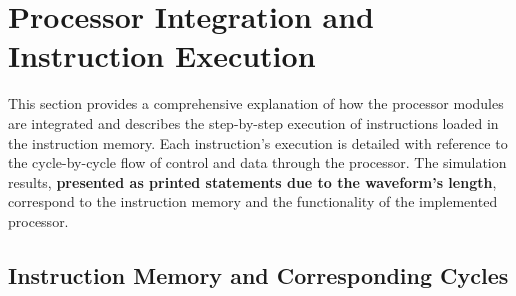 \documentclass[12pt]{article}
\begin{document}
\section*{Processor Integration and Instruction Execution}

This section provides a comprehensive explanation of how the processor modules are integrated and describes the step-by-step execution of instructions loaded in the instruction memory. Each instruction's execution is detailed with reference to the cycle-by-cycle flow of control and data through the processor. The simulation results, \textbf{presented as printed statements due to the waveform's length}, correspond to the instruction memory and the functionality of the implemented processor.

\subsection*{Instruction Memory and Corresponding Cycles}
\end{document}
